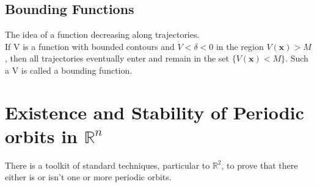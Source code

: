 \documentclass{article}
\newcommand{\bx}{\bm{x}}                                    %
\begin{document}
\subsection{Bounding Functions}
The idea of a function decreasing along trajectories.
\\
If V is a function with bounded contours and $\dot{V} < \delta <0$ in the
region $V(\bx) >M$, then all trajectories eventually enter and remain in 
the set $\{ V(\bx) < M \}$. Such a V is called a bounding function.
\\
\section{Existence and Stability of Periodic orbits in $\mathbb{R}^n$}
There is a toolkit of standard techniques, particular to $\mathbb{R}^2$, 
to prove that there either is or isn't one or more periodic orbits.
\\
\end{document}
